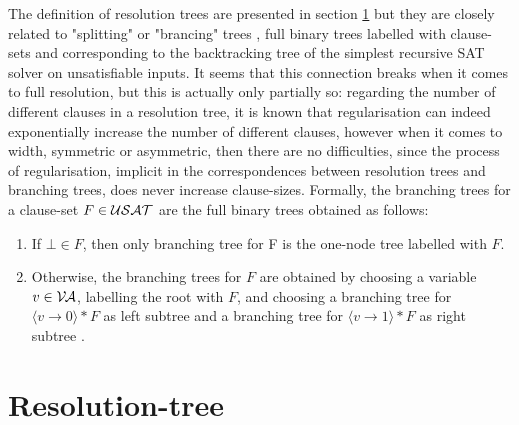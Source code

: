 \documentclass[12pt]{book}
\begin{document}
The definition of resolution trees are presented in section \ref{sec:Resolution-tree} but they are closely related to "splitting" or "brancing" trees , full binary trees labelled with clause-sets and corresponding 
to the backtracking tree of the simplest recursive SAT solver on unsatisfiable inputs. It seems that this connection breaks when it comes 
to full resolution, but this is actually only partially so: regarding the number of different clauses in a resolution tree, it is known 
that regularisation can indeed exponentially increase the number of different clauses, however when it comes to width, symmetric or 
asymmetric, then there are no difficulties, since the process of regularisation, implicit in the correspondences between resolution
trees and branching trees, does never increase clause-sizes.
Formally, the branching trees for a clause-set $F \in \mathcal{USAT}$ are the full binary trees obtained as follows:
\begin{enumerate}
\item If $\bot \in F$, then only branching tree for F is the one-node tree labelled with $F$.
\item Otherwise, the branching trees for $F$ are obtained by choosing a variable $v \in \mathcal{V\hspace{-0.1em}A}$, labelling the root with $F$, and choosing 
a branching tree for $\langle v \rightarrow 0 \rangle * F$ as left subtree and a branching tree for $\langle v \rightarrow 1 \rangle * F$ as right subtree \cite{h5}.
\end{enumerate}

\section{Resolution-tree}
\label{sec:Resolution-tree}
\end{document}
